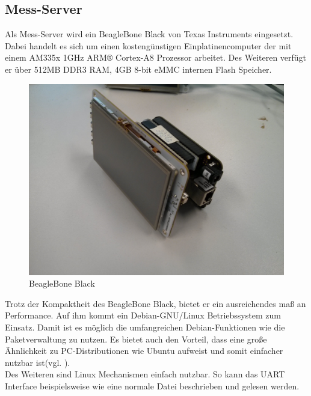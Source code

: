 
\newpage
\subsection{Mess-Server}
\label{section_Mess-Server}

Als Mess-Server wird ein BeagleBone Black von Texas Instruments eingesetzt. Dabei handelt es sich um einen kostengünstigen Einplatinencomputer der mit einem AM335x 1GHz ARM® Cortex-A8 Prozessor arbeitet. Des Weiteren verfügt er über 512MB DDR3 RAM, 4GB 8-bit eMMC internen Flash Speicher.


\begin{figure}[H]
\begin{center}
\includegraphics[width=\textwidth]{img/general/BeagleBoneBlack.jpg}
\caption{BeagleBone Black}
\label{figure_Beagleboneblack}
\end{center}
\end{figure}

Trotz der Kompaktheit des BeagleBone Black, bietet er ein ausreichendes maß an Performance. Auf ihm kommt ein Debian-GNU/Linux Betriebssystem zum Einsatz. Damit ist es möglich die umfangreichen Debian-Funktionen wie die Paketverwaltung zu nutzen. Es bietet auch den Vorteil, dass eine große Ähnlichkeit zu PC-Distributionen wie Ubuntu aufweist und somit einfacher nutzbar ist(vgl. \cite{schroeder2009embedded}).\\
Des Weiteren sind Linux Mechanismen einfach nutzbar. So kann das \ac{UART} Interface beispielsweise wie eine normale Datei beschrieben und gelesen werden.

